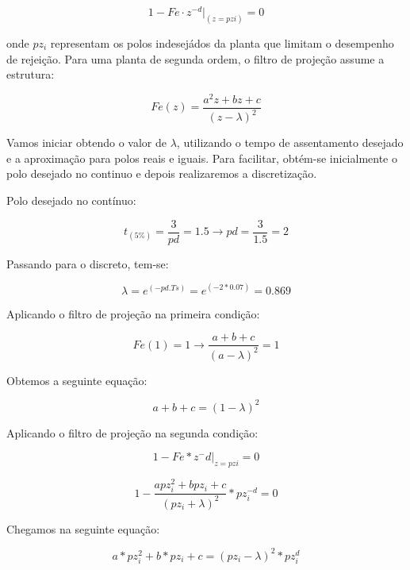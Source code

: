 \documentclass[a4paper,12pt]{article}
\begin{document}
\begin{equation}
1 - Fe \cdot z^{-d} |_{(z=pzi)} = 0 
\end{equation}

onde $pz_i$ representam os polos indesejádos da planta que limitam o desempenho de rejeição. Para uma planta de segunda ordem, o filtro de projeção assume a estrutura:

\begin{equation}
Fe(z) = \frac{a^2z+bz+c}{(z-\lambda)^2}
\end{equation}


Vamos iniciar obtendo o valor de $\lambda$, utilizando o tempo de assentamento desejado e a aproximação para polos reais e iguais. Para facilitar, obtém-se inicialmente o polo desejado  no continuo e depois realizaremos a discretização.


Polo desejado no contínuo:

\begin{equation}
t_{(5\%)} = \frac{3}{pd} = 1.5 \xrightarrow{} pd = \frac{3}{1.5} = 2
\end{equation}

Passando para o discreto, tem-se:

\begin{equation}
\lambda = e^{(-pd.Ts)} = e^{(-2*0.07)} = 0.869
\end{equation}

Aplicando o filtro de projeção na primeira condição:

\begin{equation}
Fe(1) = 1 \rightarrow \frac{a+b+c}{(a-\lambda)^2} = 1
\end{equation}

Obtemos a seguinte equação:

\begin{equation}
a+b+c = (1-\lambda)^2
\end{equation}

Aplicando o filtro de projeção na segunda condição:

\begin{equation}
1-Fe * z ^-d |_{z=pzi} = 0
\end{equation}

\begin{equation}
1-\frac{apz^2_i + bpz_i + c}{(pz_i + \lambda)^2} * pz^{-d}_i = 0
\end{equation}

Chegamos na seguinte equação:

\begin{equation}
a * pz^2_i + b*pz_i + c = (pz_i - \lambda)^2 * pz^d_i
\end{equation}
\end{document}
